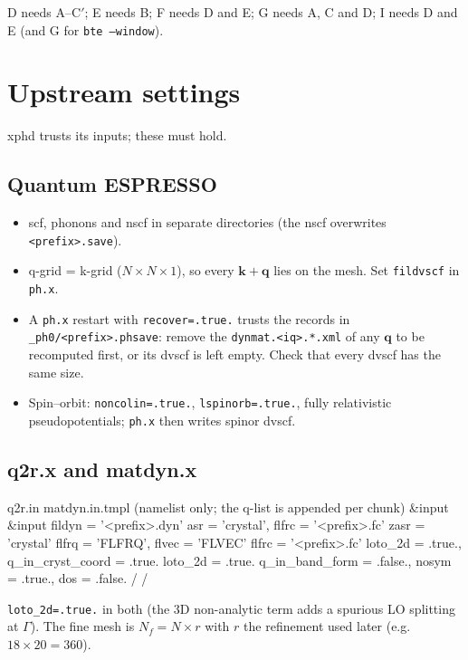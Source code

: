 \documentclass[10pt,a4paper]{article}
\newcommand{\bq}{\mathbf{q}}
\begin{document}
D needs A--C$'$; E needs B; F needs D and E; G needs A, C and D; I needs D and E (and G for \texttt{bte --window}).

\section{Upstream settings}
xphd trusts its inputs; these must hold.
\subsection{Quantum ESPRESSO}
\begin{itemize}[nosep,leftmargin=1.4em]
\item scf, phonons and nscf in separate directories (the nscf overwrites \texttt{<prefix>.save}).
\item q-grid = k-grid ($N\times N\times1$), so every $\mathbf{k}+\bq$ lies on the mesh. Set \texttt{fildvscf} in \texttt{ph.x}.
\item A \texttt{ph.x} restart with \texttt{recover=.true.} trusts the records in \texttt{\_ph0/<prefix>.phsave}: remove the
\texttt{dynmat.<iq>.*.xml} of any $\bq$ to be recomputed first, or its dvscf is left empty. Check that every dvscf has the same size.
\item Spin--orbit: \texttt{noncolin=.true.}, \texttt{lspinorb=.true.}, fully relativistic pseudopotentials; \texttt{ph.x} then writes spinor dvscf.
\end{itemize}
\subsection{q2r.x and matdyn.x}
\begin{cmd}
 q2r.in                              matdyn.in.tmpl  (namelist only; the q-list is appended per chunk)
 &input                              &input
   fildyn  = '<prefix>.dyn'            asr = 'crystal', flfrc = '<prefix>.fc'
   zasr    = 'crystal'                 flfrq = 'FLFRQ', flvec = 'FLVEC'
   flfrc   = '<prefix>.fc'             loto_2d = .true., q_in_cryst_coord = .true.
   loto_2d = .true.                    q_in_band_form = .false., nosym = .true., dos = .false.
 /                                   /
\end{cmd}
\texttt{loto\_2d=.true.} in both (the 3D non-analytic term adds a spurious LO splitting at $\Gamma$). The fine mesh is
$N_f = N\times r$ with $r$ the refinement used later (e.g.\ $18\times20=360$).
\end{document}
